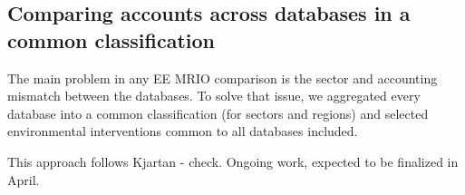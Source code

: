 \subsection{Comparing accounts across databases in a common classification}

The main problem in any EE MRIO comparison is the sector and accounting
mismatch between the databases. To solve that issue, we aggregated every
database into a common classification (for sectors and regions) and
selected environmental interventions common to all databases included.

This approach follows Kjartan - check.
Ongoing work, expected to be finalized in April.